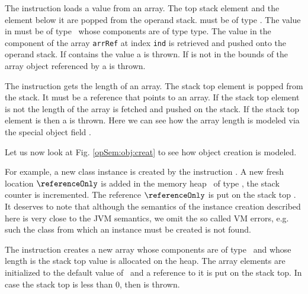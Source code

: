 The instruction \arrload{}   loads a value from an array. The top stack element \stackOnlyParam{\counterOnly} and 
the element below it 
  are popped from the operand stack.  \stackOnlyParam{\counterOnly} must be of type \Myint. The value in  must be 
 of type  \ whose components are of type \textrm{type}. The value in the component of the array  \texttt{arrRef} 
 at index \texttt{ind} is retrieved and pushed onto the operand stack.
 If  contains the value \Mynull{} a \NullPointerExc{} is thrown. If \stackOnlyParam{\counterOnly}  is
not in the bounds of the array object referenced by   a \ArrIndexOutOfBoundExc{} is thrown.

The instruction \arraylength{} gets the length of an array.
 The stack top element is popped from the stack. It must be a 
reference that points to an array. If the stack top element \stackOnlyParam{\counterOnly} is not \Mynull{}  the length of the array  
\length{\stackOnlyParam{\counterOnly} } is fetched and pushed on the stack.
If the stack top element \stackOnlyParam{\counterOnly} is \Mynull{} then a \NullPointerExc{} is thrown. Here we can see how the array
 length is modeled via the special object field \length. 


Let us now look at Fig. \ref{opSem:obj:creat} to  see how 
object creation is modeled.

 For example, a new class instance
is created by the instruction \new.  A new fresh location $\referenceOnly$ is added in the memory heap 
\heap \ of type  \clazz, the  stack counter \counterOnly is incremented. The reference $\referenceOnly$ 
is put on the stack  top . It deserves to note that although the semantics of the instance creation
 described here  is very close to the JVM semantics, we omit the so called VM errors, e.g. such the class from which an
 instance must be created is not found.    

The instruction \newarray{} creates a new array whose components are of type \anyType \ and whose length is the stack top value is allocated on the heap.
The array elements are initialized to the default value of  \anyType \ and a reference to it is put on the stack top. 
In case the stack top is less than 0, then \NegativeArraySizeExc{} is thrown.

